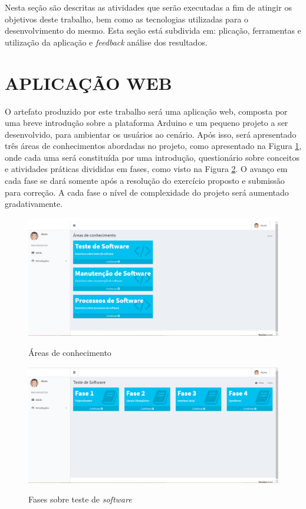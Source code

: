 Nesta seção são descritas as atividades que serão executadas a fim de atingir os objetivos deste trabalho, bem como as tecnologias utilizadas para o desenvolvimento do mesmo. Esta seção está subdivida em: plicação, ferramentas e utilização da aplicação e \textit{feedback} análise dos resultados.  

\section{APLICAÇÃO WEB}
\label{sec:desenvApp}



O artefato produzido por este trabalho será uma aplicação web, composta por uma breve introdução sobre a plataforma Arduino e um pequeno projeto a ser desenvolvido, para ambientar os usuários ao cenário. Após isso, será apresentado três áreas de conhecimentos abordadas no projeto, como apresentado na Figura \ref{fig:figura-areas-telas}, onde cada uma será constituída por uma introdução, questionário sobre conceitos e atividades práticas divididas em fases, como visto na Figura \ref{fig:figura-fases-telas}. O avanço em cada fase se dará somente após a resolução do exercício proposto e submissão para correção. A cada fase o nível de complexidade do projeto será aumentado gradativamente.

\begin{figure}[!htb]
    \centering
    \caption{Áreas de conhecimento}
    \includegraphics[width=1\textwidth]{./dados/figuras/areasTela}
    \label{fig:figura-areas-telas}
\end{figure}

\begin{figure}[!htb]
    \centering
    \caption{Fases sobre teste de \textit{software}}
    \includegraphics[width=1\textwidth]{./dados/figuras/fasesTela}
    \label{fig:figura-fases-telas}
\end{figure}
 

